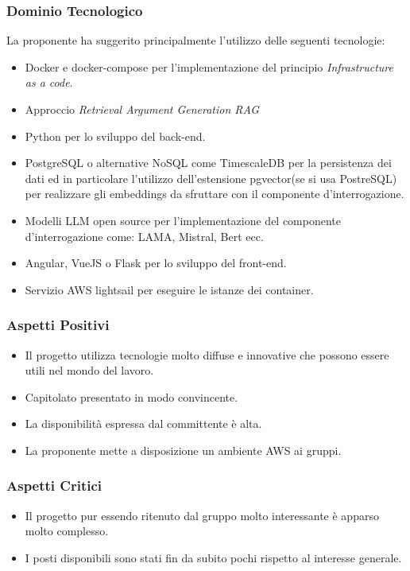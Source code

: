 \documentclass[a4paper, 12pt]{article}
\begin{document}
\subsubsection{Dominio Tecnologico}
La proponente ha suggerito principalmente l’utilizzo delle seguenti tecnologie:
\begin{itemize}
    \item Docker e docker-compose per l’implementazione del principio \textit{Infrastructure as a code}.
    \item Approccio\textit{ Retrieval Argument Generation RAG}
    \item Python per lo sviluppo del back-end.
    \item PostgreSQL o alternative NoSQL come TimescaleDB per la persistenza dei dati ed in particolare l’utilizzo dell’estensione pgvector(se si usa PostreSQL) per realizzare gli embeddings da sfruttare con il componente d'interrogazione.
    \item Modelli LLM open source per l’implementazione del componente d'interrogazione come: LAMA, Mistral, Bert ecc.
    \item Angular, VueJS o Flask per lo sviluppo del front-end.
    \item Servizio AWS lightsail per eseguire le istanze dei container.
\end{itemize}

\subsubsection{Aspetti Positivi}
\begin{itemize}
    \item Il progetto utilizza tecnologie molto diffuse e innovative che possono essere utili nel mondo del lavoro.
    \item Capitolato presentato in modo convincente.
    \item La disponibilità espressa dal committente è alta.
    \item La proponente mette a disposizione un ambiente AWS ai gruppi.
\end{itemize}

\subsubsection{Aspetti Critici}
\begin{itemize}
    \item Il progetto pur essendo ritenuto dal gruppo molto interessante è apparso molto complesso.
    \item I posti disponibili sono stati fin da subito pochi rispetto al interesse generale.
\end{itemize}
\end{document}
